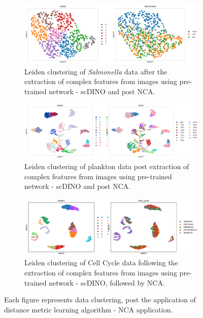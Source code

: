 \documentclass[12pt,a4paper]{article}
\begin{document}
\begin{figure}
  \centering
  \begin{subfigure}{\linewidth}
    \includegraphics[width=\linewidth]{Figures/outoftheboxscDINOpostNCA_salmonella.png}
    \caption{Leiden clustering of \textit{Salmonella} data after the extraction of complex features from images using pre-trained network - scDINO and post NCA.}
    \label{multifig5:image_a}
  \end{subfigure}
  \hfill
  \begin{subfigure}{\linewidth}
    \includegraphics[width=\linewidth]{Figures/outoftheboxscDINOpostNCA_plankton.png}
    \caption{Leiden clustering of plankton data post extraction of complex features from images using pre-trained network - scDINO and post NCA.}
    \label{multifig5:image_b}
  \end{subfigure}
  \hfill
  \begin{subfigure}{\linewidth}
    \includegraphics[width=\linewidth]{Figures/outoftheboxscDINOpostNCA_cellcycle.png}
    \caption{Leiden clustering of Cell Cycle data following the extraction of complex features from images using pre-trained network - scDINO, followed by NCA.}
    \label{multifig5:image_c}
  \end{subfigure}
  \caption{Each figure represents data clustering, post the application of distance metric learning algorithm - NCA application.}
  \label{multifig5:Outoftheboxclusters}
\end{figure}
\end{document}
